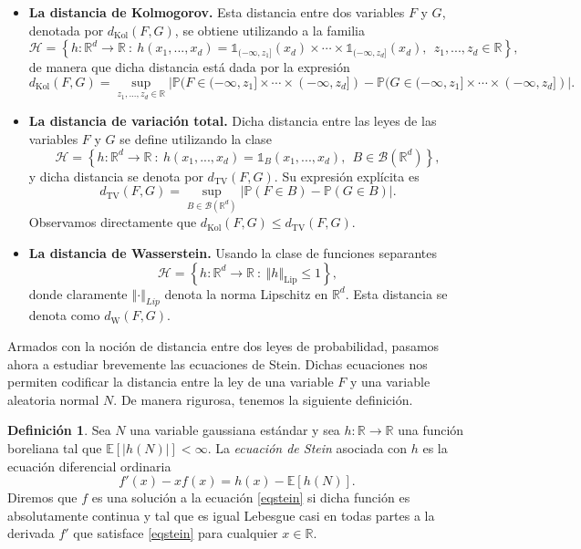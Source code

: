 \documentclass[letterpaper,twoside,12pt]{book}
\newcommand{\R}{\mathbb{R}}
\newcommand{\B}{\mathcal{B}}
\newcommand{\E}{\mathbb{E}}
\renewcommand{\P}{\mathbb{P}}
\newcommand{\1}{\mathds{1}}
\newcommand{\abs}[1]{\left\lvert #1 \right\rvert}
\renewcommand{\to}{\rightarrow}
\newcommand{\norm}[1]{\left\Vert #1 \right\Vert}
\theoremstyle{definition}
\newtheorem{dfn}{Definición}
\theoremstyle{definition}
\theoremstyle{remark}
\theoremstyle{definition}
\theoremstyle{definition}
\theoremstyle{definition}
\theoremstyle{definition}
\theoremstyle{definition}
\begin{document}
\begin{itemize}
   \item \textbf{La distancia de Kolmogorov.} Esta distancia entre dos variables $F$ y $G$, denotada por $d_{\text{Kol}}(F,G)$, se obtiene utilizando a la familia \[\mathscr{H}= \left\{h:\R^d\to \R \ :\ h(x_1,...,x_d)=\1_{(-\infty,z_1]}(x_d)\times \cdots \times \1_{(-\infty,z_d]}(x_d), \ \  z_1,...,z_d\in \R\right\},\]
   de manera que dicha distancia está dada por la expresión
   \[
   d_{\text{Kol}}(F,G)=\sup_{z_1,...,z_d\in \R}\abs{\P(F\in (-\infty,z_1]\times\cdots\times(-\infty,z_d])-\P(G\in (-\infty,z_1]\times\cdots\times(-\infty,z_d])}.
   \]
   \item \textbf{La distancia de variación total.} Dicha distancia entre las leyes de las variables $F$ y $G$ se define utilizando la clase \[\mathscr{H}=\left\{h:\R^d\to \R \ :\ h(x_1,...,x_d)=\1_B(x_1,...,x_d), \ \ B\in \B(\R^{d})\right\},\] 
   y dicha distancia se denota por $d_{\text{TV}}(F,G).$ Su expresión explícita es 
   \[
      d_{\text{TV}}(F,G)= \sup_{B\in \B(\R^{d})}\abs{\P(F\in B)-\P(G\in B)}.
   \]
   Observamos directamente que $d_{\text{Kol}}(F,G)\leq d_{\text{TV}}(F,G)$.
   \item \textbf{La distancia de Wasserstein.} Usando la clase de funciones separantes \[\mathscr{H}=\left\{h:\R^{d}\to \R \ :\ \norm{h}_{\text{Lip}}\leq 1\right\},\] donde claramente $\norm{\cdot}_{Lip}$ denota la norma Lipschitz en $\R^{d}$. Esta distancia se denota como $d_{\text{W}}(F,G)$.
\end{itemize}

Armados con la noción de distancia entre dos leyes de probabilidad, pasamos ahora a estudiar brevemente las ecuaciones de Stein. Dichas ecuaciones nos permiten codificar la distancia entre la ley de una variable $F$ y una variable aleatoria normal $N$. De manera rigurosa, tenemos la siguiente definición.

\begin{dfn} 
 Sea $N$ una variable gaussiana estándar y sea $h:\R\to\R$ una función boreliana tal que $\E\left[\abs{h(N)}\right]<\infty$. La \textit{ecuación de Stein} asociada con $h$ es la ecuación diferencial ordinaria 
 \begin{equation}\label{eqstein}
   f'(x)-xf(x)=h(x)-\E\left[h(N)\right].
 \end{equation}
 Diremos que $f$ es una solución a la ecuación \eqref{eqstein} si dicha función es absolutamente continua y tal que es igual Lebesgue casi en todas partes a la derivada $f'$ que satisface \eqref{eqstein} para cualquier $x\in \R$.
 \end{dfn}
\end{document}
